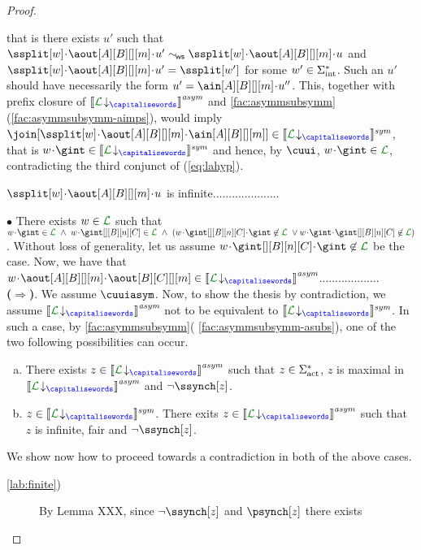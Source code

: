 \begin{proof}
\begin{description}
 that is there exists $u'$ such that
 $\ssplit[{\acword}]\cat\aout[A][B][][m]\cat u' \commds \ssplit[{\acword}]\cat\aout[A][B][][m]\cat u$ and $\ssplit[{\acword}]\cat\aout[A][B][][m]\cat u' = \ssplit[\acword']$ for some $w'\in\Sigma_{\text{int}}^*$.
Such an $u'$ should have necessarily the form $u'=\ain[A][B][][m]\cat u''$.
 This, together with prefix closure of $\asem{\proj{\clang}{}}$
 and \cref{fac:asymmsubsymm}(\ref{fac:asymmsubsymm-aimps}), would imply
$\join[{\ssplit[{\acword}]\cat\aout[A][B][][m]\cat \ain[A][B][][m]}]\in\ssem{\proj{\clang}{}}$,
that is $\acword\cat\gint\in\ssem{\proj{\clang}{}}$ and hence, by $\cuui$,
$\acword\cat\gint\in{{\clang}}$, contradicting the third conjunct of (\ref{eq:lahyp}).
%
\item
$\ssplit[{\acword}]\cat\aout[A][B][][m]\cat u$ is infinite.....................\\ 
\end{description}
$\bullet$ There exists $\acword\in\clang$ such that \\
$\acword\cat\gint\in\clang\ \land\ \acword\cat\gint[][B][n][C]\in\clang\   \land\
 (\acword\cat\gint[][B][n][C]\cat\gint\not\in\clang\ \vee \acword\cat\gint\cat\gint[][B][n][C]\not\in\clang)$.
 Without loss of generality, let us assume $\acword\cat\gint[][B][n][C]\cat\gint\not\in\clang$
 be the case.
Now, we have that $\acword\cat\aout[A][B][][m]\cat\aout[B][C][][m]\in\asem{\proj{\clang}{}}$...................\\
%
 {\bf ($\Rightarrow$)}.
 We assume $\cuuiasym$. Now, to show the thesis by contradiction, we assume 
 $\asem{\proj{\clang}{}}$ not to be equivalent to $\ssem{\proj{\clang}{}}$.
 In such a case, by \cref{fac:asymmsubsymm}( \ref{fac:asymmsubsymm-asubs}),
 one of the two following possibilities can occur.
 \begin{enumerate}[a)]
 \item
 \label{lab:finite}
 There exists $z\in \asem{\proj{\clang}{}}$ such that $z\in \Sigma_{\text{act}}^*$, $z$ is maximal in 
 $\asem{\proj{\clang}{}}$ and $\neg\ssynch[z]$.
 \item
  \label{lab:infinite}
   $z\in \ssem{\proj{\clang}{}}$.
 There exits $z\in \asem{\proj{\clang}{}}$ such that $z$ is infinite, fair and $\neg\ssynch[z]$.
 \end{enumerate}
 We show now how to proceed towards a contradiction in both of the above cases.
 \begin{description}
 \item[ \ref{lab:finite})]
 By Lemma XXX, since $\neg\ssynch[z]$ and $\psynch[z]$ there exists 

\end{description}
\end{proof}
